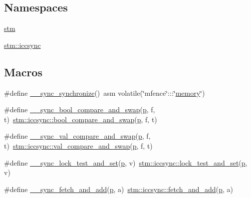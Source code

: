 \subsection*{Namespaces}
\begin{DoxyCompactItemize}
\item 
\hyperlink{namespacestm}{stm}
\item 
\hyperlink{namespacestm_1_1iccsync}{stm\-::iccsync}
\end{DoxyCompactItemize}
\subsection*{Macros}
\begin{DoxyCompactItemize}
\item 
\#define \hyperlink{icc-sync_8hpp_a3de7c4e7434d2028f0b1bdbe835ce3cb}{\-\_\-\-\_\-sync\-\_\-synchronize}()~asm volatile(\char`\"{}mfence\char`\"{}\-:::\char`\"{}\hyperlink{structmemory}{memory}\char`\"{})
\item 
\#define \hyperlink{icc-sync_8hpp_a106c3cb3f76c1c645b6ff66652034ebe}{\-\_\-\-\_\-sync\-\_\-bool\-\_\-compare\-\_\-and\-\_\-swap}(\hyperlink{counted__ptr_8hpp_a5c9f59d7c24e3fd6ceae319a968fc3e0}{p}, f, t)~\hyperlink{namespacestm_1_1iccsync_ae9b8fb58e501278819d7083a0b8802f0}{stm\-::iccsync\-::bool\-\_\-compare\-\_\-and\-\_\-swap}(\hyperlink{counted__ptr_8hpp_a5c9f59d7c24e3fd6ceae319a968fc3e0}{p}, f, t)
\item 
\#define \hyperlink{icc-sync_8hpp_a4c1e77c3050c1a0c3b61187aa6ddb996}{\-\_\-\-\_\-sync\-\_\-val\-\_\-compare\-\_\-and\-\_\-swap}(\hyperlink{counted__ptr_8hpp_a5c9f59d7c24e3fd6ceae319a968fc3e0}{p}, f, t)~\hyperlink{namespacestm_1_1iccsync_afa85ce51e68f13c37b0240e7bc662c31}{stm\-::iccsync\-::val\-\_\-compare\-\_\-and\-\_\-swap}(\hyperlink{counted__ptr_8hpp_a5c9f59d7c24e3fd6ceae319a968fc3e0}{p}, f, t)
\item 
\#define \hyperlink{icc-sync_8hpp_a6e96cfd398d8ef26762d0b774afb84c3}{\-\_\-\-\_\-sync\-\_\-lock\-\_\-test\-\_\-and\-\_\-set}(\hyperlink{counted__ptr_8hpp_a5c9f59d7c24e3fd6ceae319a968fc3e0}{p}, v)~\hyperlink{namespacestm_1_1iccsync_a9b09f35a68551cff0b8cbbd3cc4424ef}{stm\-::iccsync\-::lock\-\_\-test\-\_\-and\-\_\-set}(\hyperlink{counted__ptr_8hpp_a5c9f59d7c24e3fd6ceae319a968fc3e0}{p}, v)
\item 
\#define \hyperlink{icc-sync_8hpp_a6b733bdf11f24c72e9c1cedd35534d6e}{\-\_\-\-\_\-sync\-\_\-fetch\-\_\-and\-\_\-add}(\hyperlink{counted__ptr_8hpp_a5c9f59d7c24e3fd6ceae319a968fc3e0}{p}, a)~\hyperlink{namespacestm_1_1iccsync_ac92b0d2a99b157c716d8f842fe8233ed}{stm\-::iccsync\-::fetch\-\_\-and\-\_\-add}(\hyperlink{counted__ptr_8hpp_a5c9f59d7c24e3fd6ceae319a968fc3e0}{p}, a)
\end{DoxyCompactItemize}

